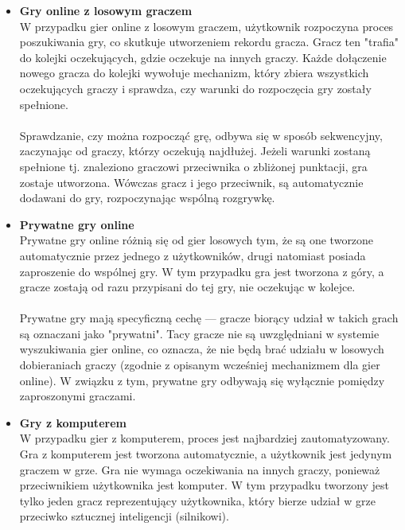 \documentclass[12pt,a4paper]{article}
\begin{document}
\begin{itemize}
    \item \textbf{Gry online z losowym graczem}\\
    W przypadku gier online z losowym graczem, użytkownik rozpoczyna proces poszukiwania gry, co skutkuje utworzeniem rekordu gracza. Gracz ten "trafia" do kolejki oczekujących, gdzie oczekuje na innych graczy. Każde dołączenie nowego gracza do kolejki wywołuje mechanizm, który zbiera wszystkich oczekujących graczy i sprawdza, czy warunki do rozpoczęcia gry zostały spełnione.
    \\\\
    Sprawdzanie, czy można rozpocząć grę, odbywa się w sposób sekwencyjny, zaczynając od graczy, którzy oczekują najdłużej. Jeżeli warunki zostaną spełnione tj. znaleziono graczowi przeciwnika o zbliżonej punktacji, gra zostaje utworzona. Wówczas gracz i jego przeciwnik, są automatycznie dodawani do gry, rozpoczynając wspólną rozgrywkę.
    
    \item \textbf{Prywatne gry online}\\
    Prywatne gry online różnią się od gier losowych tym, że są one tworzone automatycznie przez jednego z użytkowników, drugi natomiast posiada zaproszenie do wspólnej gry. W tym przypadku gra jest tworzona z góry, a gracze zostają od razu przypisani do tej gry, nie oczekując w kolejce.
    \\\\
    Prywatne gry mają specyficzną cechę — gracze biorący udział w takich grach są oznaczani jako "prywatni". Tacy gracze nie są uwzględniani w systemie wyszukiwania gier online, co oznacza, że nie będą brać udziału w losowych dobieraniach graczy (zgodnie z opisanym wcześniej mechanizmem dla gier online). W związku z tym, prywatne gry odbywają się wyłącznie pomiędzy zaproszonymi graczami.

    \item \textbf{Gry z komputerem}\\
    W przypadku gier z komputerem, proces jest najbardziej zautomatyzowany. Gra z komputerem jest tworzona automatycznie, a użytkownik jest jedynym graczem w grze. Gra nie wymaga oczekiwania na innych graczy, ponieważ przeciwnikiem użytkownika jest komputer. W tym przypadku tworzony jest tylko jeden gracz reprezentujący użytkownika, który bierze udział w grze przeciwko sztucznej inteligencji (silnikowi).

\end{itemize}
\end{document}
